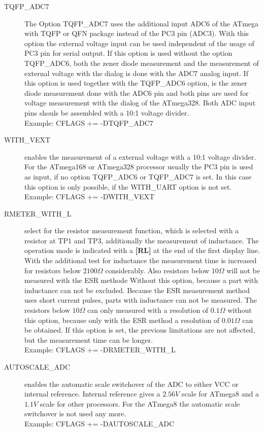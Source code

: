 \begin{description}
  \item[TQFP\_ADC7] The Option TQFP\_ADC7 uses the additional input ADC6 of the ATmega with TQFP or QFN package instead of
the PC3 pin (ADC3).
With this option the external voltage input can be used independent of the usage of PC3 pin for serial output.
If this option is used without the option TQFP\_ADC6, both the zener diode measurement and the measurement of external voltage
with the dialog is done with the ADC7 analog input.
If this option is used together with the TQFP\_ADC6 option, is the zener diode measurement done with the ADC6 pin and
both pins are used for voltage measurement with the dialog of the ATmega328.
Both ADC input pins shouls be assembled with a 10:1 voltage divider.\\
Example: CFLAGS += -DTQFP\_ADC7

  \item[WITH\_VEXT] enables the measurement of a external voltage with a 10:1 voltage divider.
For the ATmega168 or ATmega328 processor usually the PC3 pin is used as input, if no option TQFP\_ADC6 or
TQFP\_ADC7 is set. In this case this option is only possible, if the WITH\_UART option is not set.\\
Example: CFLAGS += -DWITH\_VEXT 

  \item[RMETER\_WITH\_L] select for the resistor measurement function, which is selected with a resistor at TP1 and TP3,
additionally the measurement of inductance. The operation mode is indicated with a \textbf{[RL]} at the end of the first display line.
With the additional test for inductance the measurement time is increased for resistors below \(2100\Omega\) considerably.
Also resistors below \(10\Omega\) will not be measured with the ESR methode Without this option, because
a part with inductance can not be excluded. Because the ESR measurement method  uses short current pulses,
parts with inductance can not be measured. The resistors below \(10\Omega\) can only measured with a resolution of
\(0.1\Omega\) without this option, because only with the ESR method a resolution of \(0.01\Omega\) can be obtained.
If this option is set, the previous limitations are not affected, but the measurement time can be longer.\\
Example: CFLAGS += -DRMETER\_WITH\_L

  \item[AUTOSCALE\_ADC] enables the automatic scale switchover of the ADC to either VCC or internal reference.
Internal reference gives a \(2.56V\) scale for ATmega8 and a \(1.1V\) scale for other processors.
For the ATmega8 the automatic scale switchover is not used any more.\\
Example: CFLAGS += -DAUTOSCALE\_ADC


\end{description}
